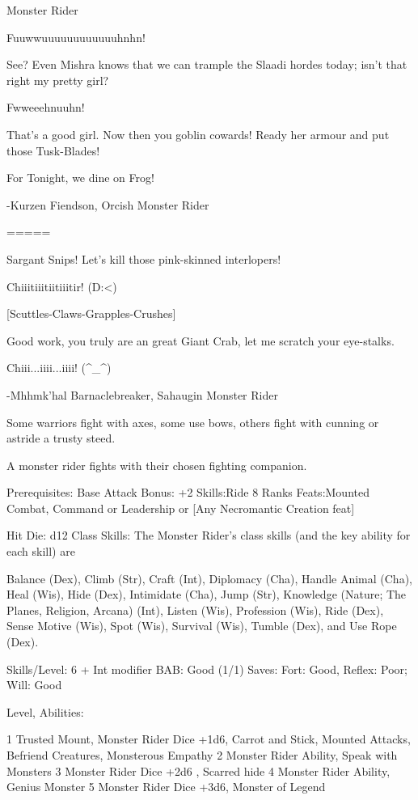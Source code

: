 Monster Rider


Fuuwwuuuuuuuuuuuuhnhn!

See? Even Mishra knows that we can trample the Slaadi hordes today; isn't that right my pretty girl?

Fwweeehnuuhn!

That's a good girl. Now then you goblin cowards! Ready her armour and put those Tusk-Blades!

For Tonight, we dine on Frog!

-Kurzen Fiendson, Orcish Monster Rider

=====

Sargant Snips! Let's kill those pink-skinned interlopers!

Chiiitiiitiitiiitir! (D:<)

[Scuttles-Claws-Grapples-Crushes]

Good work, you truly are an great Giant Crab, let me scratch your eye-stalks.

Chiii...iiii...iiii! (^_^)

-Mhhmk'hal Barnaclebreaker, Sahaugin Monster Rider

Some warriors fight with axes, some use bows, others fight with cunning or astride a trusty steed.

A monster rider fights with their chosen fighting companion.

Prerequisites:
Base Attack Bonus: +2
Skills:Ride 8 Ranks
Feats:Mounted Combat, Command or Leadership or [Any Necromantic Creation feat]

Hit Die: d12
Class Skills: The Monster Rider's class skills (and the key ability for each skill) are

Balance (Dex), Climb (Str), Craft (Int), Diplomacy (Cha), Handle Animal (Cha), Heal (Wis), Hide (Dex), Intimidate (Cha), Jump (Str), Knowledge (Nature; The Planes, Religion, Arcana) (Int), Listen (Wis), Profession (Wis), Ride (Dex), Sense Motive (Wis), Spot (Wis), Survival (Wis), Tumble (Dex), and Use Rope (Dex).


Skills/Level: 6 + Int modifier
BAB: Good (1/1) Saves: Fort: Good, Reflex: Poor; Will: Good

Level, Abilities:

1 Trusted Mount, Monster Rider Dice +1d6, Carrot and Stick, Mounted Attacks, Befriend Creatures, Monsterous Empathy
2 Monster Rider Ability, Speak with Monsters
3 Monster Rider Dice +2d6 , Scarred hide
4 Monster Rider Ability, Genius Monster
5 Monster Rider Dice +3d6, Monster of Legend

